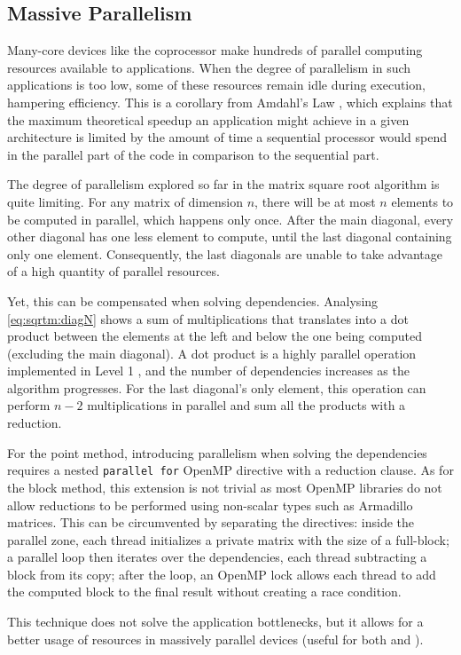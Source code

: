 \documentclass[../thesis]{subfiles}
\begin{document}
	\subsection{Massive Parallelism}
	\label{subsec:mic:optims:massive}

	Many-core devices like the \intel\xeonphi coprocessor make hundreds of parallel computing resources available to applications. When the degree of parallelism in such applications is too low, some of these resources remain idle during execution, hampering efficiency. This is a corollary from Amdahl's Law \cite{Amdahl:1967}, which explains that the maximum theoretical speedup an application might achieve in a given architecture is limited by the amount of time a sequential processor would spend in the parallel part of the code in comparison to the sequential part.

	The degree of parallelism explored so far in the matrix square root algorithm is quite limiting. For any matrix of dimension $n$, there will be at most $n$ elements to be computed in parallel, which happens only once. After the main diagonal, every other diagonal has one less element to compute, until the last diagonal containing only one element. Consequently, the last diagonals are unable to take advantage of a high quantity of parallel resources.

	Yet, this can be compensated when solving dependencies. Analysing \cref{eq:sqrtm:diagN} shows a sum of multiplications that translates into a dot product between the elements at the left and below the one being computed (excluding the main diagonal). A dot product is a highly parallel operation implemented in Level 1 \blas, and the number of dependencies increases as the algorithm progresses. For the last diagonal's only element, this operation can perform $n-2$ multiplications in parallel and sum all the products with a reduction.

	For the point method, introducing parallelism when solving the dependencies requires a nested \texttt{parallel for} OpenMP directive with a reduction clause. As for the block method, this extension is not trivial as most OpenMP libraries do not allow reductions to be performed using non-scalar types such as Armadillo matrices. This can be circumvented by separating the directives: inside the parallel zone, each thread initializes a private matrix with the size of a full-block; a parallel loop then iterates over the dependencies, each thread subtracting a block from its copy; after the loop, an OpenMP lock allows each thread to add the computed block to the final result without creating a race condition.

	This technique does not solve the application bottlenecks, but it allows for a better usage of resources in massively parallel devices (useful for both \intel\xeonphi and \gpus).
\end{document}
